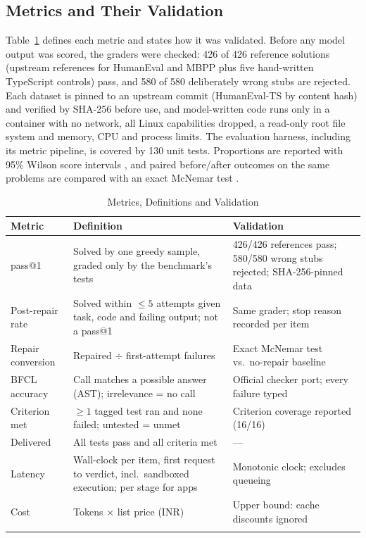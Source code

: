 \documentclass[pdflatex,sn-mathphys-num]{sn-jnl}%
\theoremstyle{thmstyleone}%
\theoremstyle{thmstyletwo}%
\theoremstyle{thmstylethree}%
\begin{document}
\subsection{Metrics and Their Validation}\label{sec8.2}

Table~\ref{tab3} defines each metric and states how it was validated. Before any model output was scored, the graders were checked: 426 of 426 reference solutions (upstream references for HumanEval and MBPP plus five hand-written TypeScript controls) pass, and 580 of 580 deliberately wrong stubs are rejected. Each dataset is pinned to an upstream commit (HumanEval-TS by content hash) and verified by SHA-256 before use, and model-written code runs only in a container with no network, all Linux capabilities dropped, a read-only root file system and memory, CPU and process limits. The evaluation harness, including its metric pipeline, is covered by 130 unit tests. Proportions are reported with 95\% Wilson score intervals \cite{r31wilson}, and paired before/after outcomes on the same problems are compared with an exact McNemar test \cite{r32mcnemar}.%

\begin{table}[t]
\caption{Metrics, Definitions and Validation}\label{tab3}%
\small
\begin{tabular*}{\textwidth}{@{\extracolsep\fill}p{2.2cm}p{5.2cm}p{4.3cm}@{}}
\toprule
\raggedright{}\textbf{Metric} & \raggedright{}\textbf{Definition} & \raggedright{}\textbf{Validation}\tabularnewline
\midrule
\raggedright{}pass@1 & \raggedright{}Solved by one greedy sample, graded only by the benchmark's tests & \raggedright{}426/426 references pass; 580/580 wrong stubs rejected; SHA-256-pinned data\tabularnewline
\raggedright{}Post-repair rate & \raggedright{}Solved within $\leq 5$ attempts given task, code and failing output; not a pass@1 & \raggedright{}Same grader; stop reason recorded per item\tabularnewline
\raggedright{}Repair conversion & \raggedright{}Repaired $\div$ first-attempt failures & \raggedright{}Exact McNemar test vs.\ no-repair baseline\tabularnewline
\raggedright{}BFCL accuracy & \raggedright{}Call matches a possible answer (AST); irrelevance = no call & \raggedright{}Official checker port; every failure typed\tabularnewline
\raggedright{}Criterion met & \raggedright{}$\geq 1$ tagged test ran and none failed; untested = unmet & \raggedright{}Criterion coverage reported (16/16)\tabularnewline
\raggedright{}Delivered & \raggedright{}All tests pass and all criteria met & \raggedright{}---\tabularnewline
\raggedright{}Latency & \raggedright{}Wall-clock per item, first request to verdict, incl.\ sandboxed execution; per stage for apps & \raggedright{}Monotonic clock; excludes queueing\tabularnewline
\raggedright{}Cost & \raggedright{}Tokens $\times$ list price (INR) & \raggedright{}Upper bound: cache discounts ignored\tabularnewline
\botrule
\end{tabular*}
\end{table}
\end{document}
